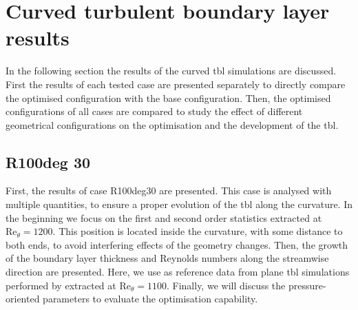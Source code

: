 \section{Curved turbulent boundary layer results}

In the following section the results of the curved \acrshort{tbl} simulations are discussed.
First the results of each tested case are presented separately to directly compare the optimised configuration with the base configuration.
Then, the optimised configurations of all cases are compared to study the effect of different geometrical configurations on the optimisation and the development of the \acrshort{tbl}.

\subsection{R100deg 30}
First, the results of case R100deg30 are presented. 
This case is analysed with multiple quantities, to ensure a proper evolution of the \acrshort{tbl} along the curvature.
In the beginning we focus on the first and second order statistics extracted at $\mathrm{Re}_{\theta} = 1200$. 
This position is located inside the curvature, with some distance to both ends, to avoid interfering effects of the geometry changes.
Then, the growth of the boundary layer thickness and Reynolds numbers along the streamwise direction are presented. 
Here, we use as reference data from plane \acrshort{tbl} simulations performed by \citet{jimenez_near-wall_2013} extracted at $\mathrm{Re}_{\theta} = 1100$.
Finally, we will discuss the pressure-oriented parameters to evaluate the optimisation capability. 

